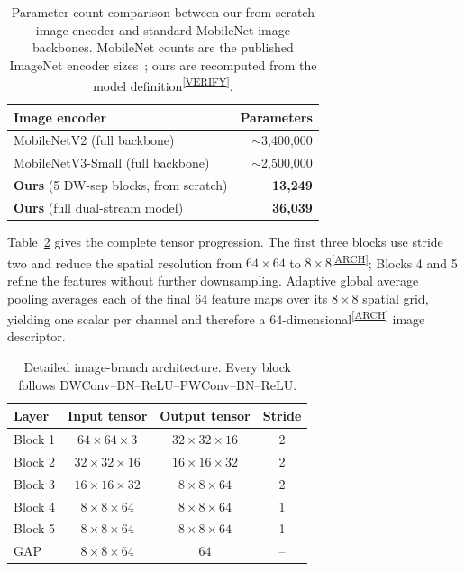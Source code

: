 \documentclass[10pt,twocolumn,a4paper]{article}
\newcommand{\evidence}[1]{\textsuperscript{\scriptsize[\hyperref[ev:#1]{#1}]}}
\newcommand{\result}[2]{#1\evidence{#2}}
\begin{document}
\begin{table}[t]
  \centering
  \caption{Parameter-count comparison between our from-scratch image encoder
  and standard MobileNet image backbones. MobileNet counts are the published
  ImageNet encoder sizes~\cite{sandler2018mobilenetv2,howard2019mobilenetv3};
  ours are recomputed from the model definition\evidence{VERIFY}.}
  \label{tab:size-compare}
  \small
  \setlength{\tabcolsep}{5pt}
  \begin{tabular}{lr}
    \toprule
    Image encoder & Parameters \\
    \midrule
    MobileNetV2 (full backbone)        & $\sim$3{,}400{,}000 \\
    MobileNetV3-Small (full backbone)  & $\sim$2{,}500{,}000 \\
    \textbf{Ours} (5 DW-sep blocks, from scratch) & \textbf{13{,}249} \\
    \midrule
    \textbf{Ours} (full dual-stream model)        & \textbf{36{,}039} \\
    \bottomrule
  \end{tabular}
\end{table}

Table~\ref{tab:image-branch} gives the complete tensor progression. The first
three blocks use stride two and reduce the spatial resolution from
\result{$64{\times}64$ to $8{\times}8$}{ARCH}; Blocks 4 and 5 refine the
features without further downsampling. Adaptive global average pooling
averages each of the final 64 feature maps over its $8\times8$ spatial grid,
yielding one scalar per channel and therefore a
\result{64-dimensional}{ARCH} image descriptor.

\begin{table}[t]
  \centering
  \caption{Detailed image-branch architecture. Every block follows
  DWConv--BN--ReLU--PWConv--BN--ReLU.}
  \label{tab:image-branch}
  \small
  \begin{tabular}{lccc}
    \toprule
    Layer & Input tensor & Output tensor & Stride \\
    \midrule
    Block 1 & $64{\times}64{\times}3$  & $32{\times}32{\times}16$ & 2 \\
    Block 2 & $32{\times}32{\times}16$ & $16{\times}16{\times}32$ & 2 \\
    Block 3 & $16{\times}16{\times}32$ & $8{\times}8{\times}64$   & 2 \\
    Block 4 & $8{\times}8{\times}64$   & $8{\times}8{\times}64$   & 1 \\
    Block 5 & $8{\times}8{\times}64$   & $8{\times}8{\times}64$   & 1 \\
    GAP     & $8{\times}8{\times}64$   & $64$                     & -- \\
    \bottomrule
  \end{tabular}
\end{table}
\end{document}
